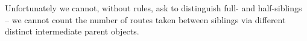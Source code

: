 {%

%

Unfortunately we cannot, without rules, ask \owlii to distinguish full- and half-siblings -- we cannot count the number of routes taken between siblings via different distinct intermediate parent objects. %

}
